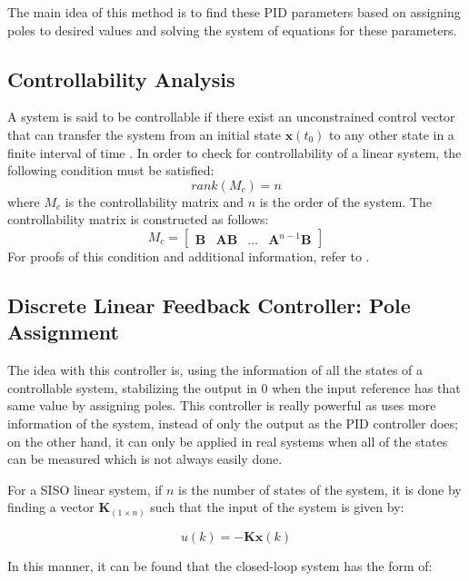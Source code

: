 The main idea of this method is to find these PID parameters based on assigning poles to desired values and solving the system of equations for these parameters.


\subsection{Controllability Analysis}
A system is said to be controllable if there exist an unconstrained control vector that can transfer the system from an initial state $\mathbf{x}(t_0)$ to any other state in a finite interval of time \cite[p. 675]{ogata2010modern}. In order to check for controllability of a linear system, the following condition must be satisfied:
\begin{equation}
    rank\left(M_c\right)=n
\end{equation}
where $M_c$ is the controllability matrix and $n$ is the order of the system. The controllability matrix is constructed as follows:
\begin{equation}
    M_c=\begin{bmatrix}\mathbf{B}&\mathbf{AB}&\ldots&\mathbf{A}^{n-1}\mathbf{B}\end{bmatrix}
\end{equation}
For proofs of this condition and additional information, refer to \cite[pp. 675-682]{ogata2010modern}.

\subsection{Discrete Linear Feedback Controller: Pole Assignment}\label{sec:state_feed}
The idea with this controller is, using the information of all the states of a controllable system, stabilizing the output in 0 when the input reference has that same value by assigning poles. This controller is really powerful as uses more information of the system, instead of only the output as the PID controller does; on the other hand, it can only be applied in real systems when all of the states can be measured which is not always easily done. 

For a SISO linear system, if $n$ is the number of states of the system, it is done by finding a vector $\mathbf{K}_{(1 \times n)}$ such that the input of the system is given by:

\begin{equation}
    u(k) = -\mathbf{K}\mathbf{x}(k)
\end{equation}


In this manner, it can be found that the closed-loop system has the form of:

